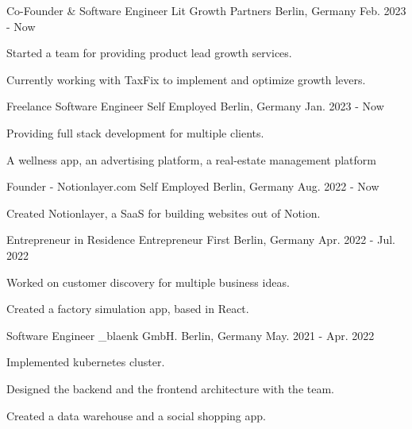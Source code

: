 


\begin{cventries}

\cventry
{Co-Founder & Software Engineer}
{Lit Growth Partners}
{Berlin, Germany}
{Feb. 2023 - Now}
{
  \begin{cvitems}
    \item {Started a team for providing product lead growth services.}
    \item {Currently working with TaxFix to implement and optimize growth levers.}
  \end{cvitems}
}

\cventry
{Freelance Software Engineer}
{Self Employed}
{Berlin, Germany}
{Jan. 2023 - Now}
{
  \begin{cvitems}
    \item {Providing full stack development for multiple clients.}
    \item {A wellness app, an advertising platform, a real-estate management platform}
  \end{cvitems}
}

\cventry
{Founder - Notionlayer.com}
{Self Employed}
{Berlin, Germany}
{Aug. 2022 - Now}
{
  \begin{cvitems}
    \item {Created Notionlayer, a SaaS for building websites out of Notion.}
  \end{cvitems}
}


\cventry
{Entrepreneur in Residence}
{Entrepreneur First}
{Berlin, Germany}
{Apr. 2022 - Jul. 2022}
{
  \begin{cvitems}
    \item {Worked on customer discovery for multiple business ideas.}
    \item {Created a factory simulation app, based in React.}
  \end{cvitems}
}


\cventry
{Software Engineer}
{\_blaenk GmbH.}
{Berlin, Germany}
{May. 2021 - Apr. 2022}
{
  \begin{cvitems}
    \item {Implemented kubernetes cluster.}
    \item {Designed the backend and the frontend architecture with the team.}
    \item {Created a data warehouse and a social shopping app.}
  \end{cvitems}
}


\end{cventries}
